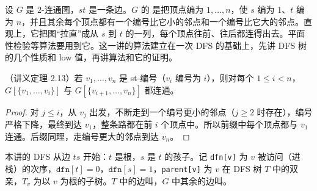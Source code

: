 \label{lec:st-numbering}

设 $G$ 是 $2$-连通图，$st$ 是一条边。$G$ 的 是把顶点编为 $1,\dots,n$，使 $s$ 编为 $1$、$t$ 编为 $n$，并且其余每个顶点都有一个编号比它小的邻点和一个编号比它大的邻点。直观上，它把图“拉直”成从 $s$ 到 $t$ 的一列，每个顶点往前、往后都连得出去。平面性检验等算法要用到它。这一讲的算法建立在一次 DFS 的基础上，先讲 DFS 树的几个性质和 low 值，再讲算法和它的证明。

\begin{theorem}\label{thm:st-numbering:prefix}
（讲义定理 2.13）若 $v_1,\dots,v_n$ 是 st-编号（$v_i$ 编号为 $i$），则对每个 $1\leqslant i<n$，$G[\{v_1,\dots,v_i\}]$ 与 $G[\{v_{i+1},\dots,v_n\}]$ 都连通。
\end{theorem}
\begin{proof}
对 $j\leqslant i$，从 $v_j$ 出发，不断走到一个编号更小的邻点（$j\geqslant2$ 时存在），编号严格下降，最终到达 $v_1$，整条路都在前 $i$ 个顶点中。所以前缀中每个顶点都与 $v_1$ 连通。后缀同理，走编号更大的邻点到达 $v_n$。
\end{proof}


本讲的 DFS 从边 $ts$ 开始：$t$ 是根，$s$ 是 $t$ 的孩子。记 \texttt{dfn[v]} 为 $v$ 被访问（进栈）的次序，$\texttt{dfn}[t]=0$，$\texttt{dfn}[s]=1$，\texttt{parent[v]} 为 $v$ 在 DFS 树 $T$ 中的双亲，$T_v$ 为以 $v$ 为根的子树。$T$ 中的边叫，$G$ 中其余的边叫。

